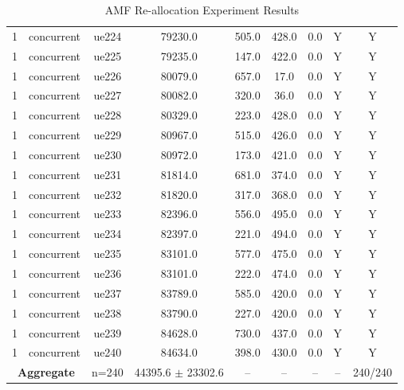 \begin{table}[ht]
\begin{tabular}{|c|c|c|c|c|c|c|c|c|}
1 & concurrent & ue224 & 79230.0 & 505.0 & 428.0 & 0.0 & Y & Y \\
1 & concurrent & ue225 & 79235.0 & 147.0 & 422.0 & 0.0 & Y & Y \\
1 & concurrent & ue226 & 80079.0 & 657.0 & 17.0 & 0.0 & Y & Y \\
1 & concurrent & ue227 & 80082.0 & 320.0 & 36.0 & 0.0 & Y & Y \\
1 & concurrent & ue228 & 80329.0 & 223.0 & 428.0 & 0.0 & Y & Y \\
1 & concurrent & ue229 & 80967.0 & 515.0 & 426.0 & 0.0 & Y & Y \\
1 & concurrent & ue230 & 80972.0 & 173.0 & 421.0 & 0.0 & Y & Y \\
1 & concurrent & ue231 & 81814.0 & 681.0 & 374.0 & 0.0 & Y & Y \\
1 & concurrent & ue232 & 81820.0 & 317.0 & 368.0 & 0.0 & Y & Y \\
1 & concurrent & ue233 & 82396.0 & 556.0 & 495.0 & 0.0 & Y & Y \\
1 & concurrent & ue234 & 82397.0 & 221.0 & 494.0 & 0.0 & Y & Y \\
1 & concurrent & ue235 & 83101.0 & 577.0 & 475.0 & 0.0 & Y & Y \\
1 & concurrent & ue236 & 83101.0 & 222.0 & 474.0 & 0.0 & Y & Y \\
1 & concurrent & ue237 & 83789.0 & 585.0 & 420.0 & 0.0 & Y & Y \\
1 & concurrent & ue238 & 83790.0 & 227.0 & 420.0 & 0.0 & Y & Y \\
1 & concurrent & ue239 & 84628.0 & 730.0 & 437.0 & 0.0 & Y & Y \\
1 & concurrent & ue240 & 84634.0 & 398.0 & 430.0 & 0.0 & Y & Y \\
\multicolumn{2}{|c|}{\textbf{Aggregate}} & n=240 & 44395.6 $\pm$ 23302.6 & -- & -- & -- & -- & 240/240 \\
\hline
\end{tabular}
\caption{AMF Re-allocation Experiment Results}
\label{tab:amf_realloc}
\end{table}
